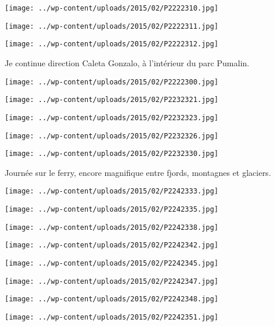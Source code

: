  \newline
\centerline{\texttt{[image: ../wp-content/uploads/2015/02/P2222310.jpg]} } 
 \newline
\centerline{\texttt{[image: ../wp-content/uploads/2015/02/P2222311.jpg]} } 
 \newline
\centerline{\texttt{[image: ../wp-content/uploads/2015/02/P2222312.jpg]} } 
Je continue direction Caleta Gonzalo, à l'intérieur du parc Pumalin. \newline
 \newline
\centerline{\texttt{[image: ../wp-content/uploads/2015/02/P2222300.jpg]} } 
 \newline
 \newline
\centerline{\texttt{[image: ../wp-content/uploads/2015/02/P2232321.jpg]} } 
 \newline
\centerline{\texttt{[image: ../wp-content/uploads/2015/02/P2232323.jpg]} } 
 \newline
\centerline{\texttt{[image: ../wp-content/uploads/2015/02/P2232326.jpg]} } 
 \newline
\centerline{\texttt{[image: ../wp-content/uploads/2015/02/P2232330.jpg]} } 
 \newline
 Journée sur le ferry, encore magnifique entre fjords, montagnes et glaciers.\newline
\centerline{\texttt{[image: ../wp-content/uploads/2015/02/P2242333.jpg]} } 
 \newline
 \newline
\centerline{\texttt{[image: ../wp-content/uploads/2015/02/P2242335.jpg]} } 
 \newline
\centerline{\texttt{[image: ../wp-content/uploads/2015/02/P2242338.jpg]} } 
 \newline
\centerline{\texttt{[image: ../wp-content/uploads/2015/02/P2242342.jpg]} } 
 \newline
\centerline{\texttt{[image: ../wp-content/uploads/2015/02/P2242345.jpg]} } 
 \newline
\centerline{\texttt{[image: ../wp-content/uploads/2015/02/P2242347.jpg]} } 
 \newline
\centerline{\texttt{[image: ../wp-content/uploads/2015/02/P2242348.jpg]} } 
 \newline
\centerline{\texttt{[image: ../wp-content/uploads/2015/02/P2242351.jpg]} } 
 \newline
